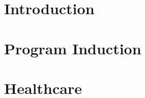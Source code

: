 


\coverpage{\TITLE}{\SUBTITLE}{\AUTHOR}{\DATE}{\SUBJECT}

\newpage



\tableofcontents

\listoffigures

\listoftables



\newpage


\part{Introduction}
\label{part:intro}

\newpage


\newpage


\newpage


\part{Program Induction}
\label{part:proginduction}

\newpage


\newpage


\newpage


\newpage


\newpage


\newpage


\part{Healthcare}
\label{part:health}

